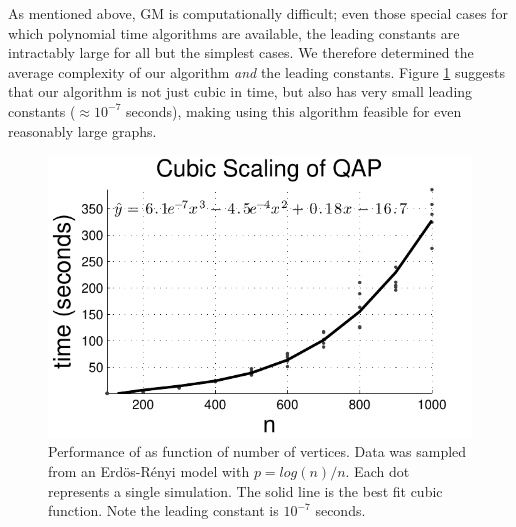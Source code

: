 \documentclass[10pt,journal,cspaper,compsoc]{IEEEtran}
\begin{document}
As mentioned above, GM is computationally difficult; even those special cases for which polynomial time algorithms are available, the leading constants are intractably large for all but the simplest cases. We therefore determined the average complexity of our algorithm \emph{and} the leading constants.  Figure \ref{fig:scaling} suggests that our algorithm is not just cubic in time, but also has very small leading constants ($\approx 10^{-7}$ seconds), making using this algorithm feasible for even reasonably large graphs.



\begin{figure}[htbp]
	\centering			
	\includegraphics[width=1.0\linewidth]{../figs/digraph_qap2}
	\caption{Performance of \faqap as function of number of vertices. Data was sampled from an Erd\"os-R\'enyi model with $p=log(n)/n$.  Each dot represents a single simulation.  The solid line is the best fit cubic function.  Note the leading constant is $10^{-7}$ seconds. }
	\label{fig:scaling}
\end{figure}
\end{document}
